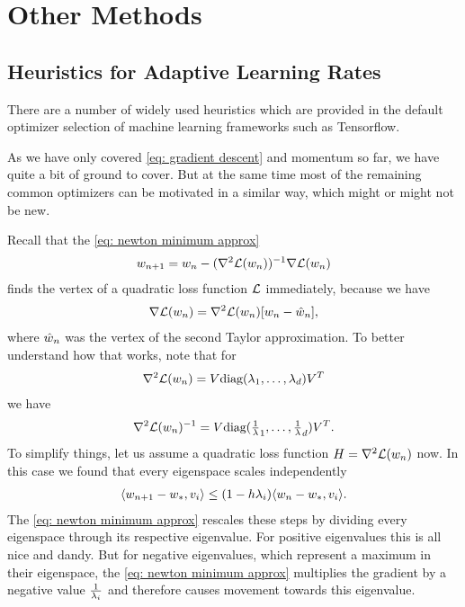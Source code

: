 
\chapter{Other Methods}\label{chap: other methods}


\section{Heuristics for Adaptive Learning Rates}
\label{sec: heuristics for adpative learning rates}

There are a number of widely used heuristics which are provided in the
default optimizer selection of machine learning frameworks such as Tensorflow.

As we have only covered \ref{eq: gradient descent} and momentum so far, we have
quite a bit of ground to cover. But at the same time most of the remaining
common optimizers \parencite[as reviewed by e.g.][]{ruderOverviewGradientDescent2017}
can be motivated in a similar way, which might or might not be new.

Recall that the \ref{eq: newton minimum approx}
\begin{align*}
	w_{n+1}	= w_n - (\nabla^2\mathcal{L}(w_n))^{-1}\nabla\mathcal{L}(w_n)
\end{align*}
finds the vertex of a quadratic loss function \(\mathcal{L}\) immediately, because we
have
\begin{align*}
	\nabla\mathcal{L}(w_n) = \nabla^2\mathcal{L}(w_n)[w_n - \hat{w}_n],
\end{align*}
where \(\hat{w}_n\) was the vertex of the second Taylor approximation.
To better understand how that works, note that for
\begin{align*}
	\nabla^2\mathcal{L}(w_n) = V \text{diag}(\lambda_1,\dots,\lambda_d)V^T
\end{align*}
we have
\begin{align*}
	\nabla^2\mathcal{L}(w_n)^{-1}
	= V \text{diag}(\tfrac1{\lambda}_1,\dots,\tfrac1{\lambda}_d)V^T.
\end{align*}
To simplify things, let us assume a quadratic loss function
\(H=\nabla^2\mathcal{L}(w_n)\) now.  In this case we found that every
eigenspace scales independently
\begin{align*}
	\langle w_{n+1} - w_*, v_i \rangle
	\le (1-h \lambda_i)\langle w_n - w_*, v_i \rangle.
\end{align*}
The \ref{eq: newton minimum approx} rescales these steps by dividing every
eigenspace through its respective eigenvalue. For positive eigenvalues this is
all nice and dandy. But for negative eigenvalues, which represent a maximum in
their eigenspace, the \ref{eq: newton minimum approx} multiplies the gradient by
a negative value \(\tfrac1{\lambda_i}\) and therefore causes movement towards
this eigenvalue.

